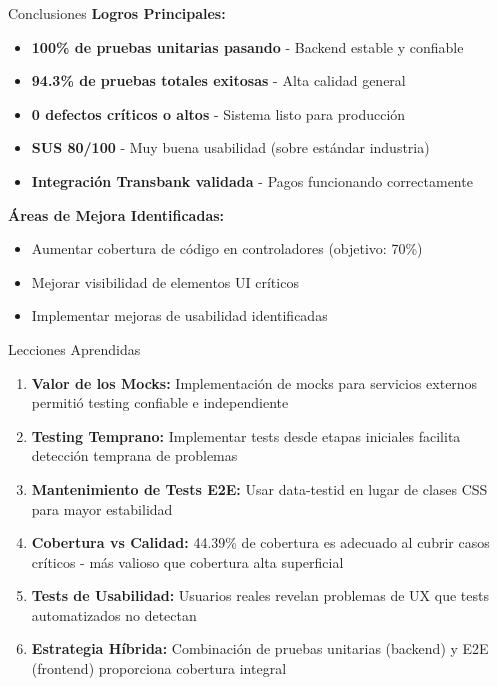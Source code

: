 \documentclass[aspectratio=169]{beamer}
\begin{document}
\begin{frame}{Conclusiones}
\textbf{Logros Principales:}
\begin{itemize}
    \item[\textcolor{successgreen}{\faCheckCircle}] \textbf{100\% de pruebas unitarias pasando} - Backend estable y confiable
    \item[\textcolor{successgreen}{\faCheckCircle}] \textbf{94.3\% de pruebas totales exitosas} - Alta calidad general
    \item[\textcolor{successgreen}{\faCheckCircle}] \textbf{0 defectos críticos o altos} - Sistema listo para producción
    \item[\textcolor{successgreen}{\faCheckCircle}] \textbf{SUS 80/100} - Muy buena usabilidad (sobre estándar industria)
    \item[\textcolor{successgreen}{\faCheckCircle}] \textbf{Integración Transbank validada} - Pagos funcionando correctamente
\end{itemize}

\vspace{0.5cm}

\textbf{Áreas de Mejora Identificadas:}
\begin{itemize}
    \item[\textcolor{warningorange}{\faWrench}] Aumentar cobertura de código en controladores (objetivo: 70\%)
    \item[\textcolor{warningorange}{\faWrench}] Mejorar visibilidad de elementos UI críticos
    \item[\textcolor{warningorange}{\faWrench}] Implementar mejoras de usabilidad identificadas
\end{itemize}
\end{frame}

\begin{frame}{Lecciones Aprendidas}
\begin{enumerate}
    \item \textbf{Valor de los Mocks:} Implementación de mocks para servicios externos permitió testing confiable e independiente

    \item \textbf{Testing Temprano:} Implementar tests desde etapas iniciales facilita detección temprana de problemas

    \item \textbf{Mantenimiento de Tests E2E:} Usar data-testid en lugar de clases CSS para mayor estabilidad

    \item \textbf{Cobertura vs Calidad:} 44.39\% de cobertura es adecuado al cubrir casos críticos - más valioso que cobertura alta superficial

    \item \textbf{Tests de Usabilidad:} Usuarios reales revelan problemas de UX que tests automatizados no detectan

    \item \textbf{Estrategia Híbrida:} Combinación de pruebas unitarias (backend) y E2E (frontend) proporciona cobertura integral
\end{enumerate}
\end{frame}
\end{document}
